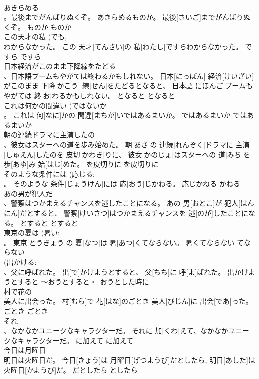 \documentclass[8pt]{extreport}
\begin{document}
\begin{CJK}{UTF8}{min}
\\	あきらめる 
\\	。最後までがんばりぬくぞ。	あきらめるものか。 最後[さいご]までがんばりぬくぞ。	ものか	ものか	
\\	この天才の私 (でも, 
\\	わからなかった。	この 天才[てんさい]の 私[わたし]ですらわからなかった。	ですら	ですら	
\\	日本経済がこのまま下降線をたどる 
\\	、日本語ブームもやがては終わるかもしれない。	日本[にっぽん] 経済[けいざい]がこのまま 下降[かこう] 線[せん]をたどるとなると、 日本語[にほんご]ブームもやがては 終[お]わるかもしれない。	となると	となると	
\\	これは何かの間違い (ではないか 
\\	。	これは 何[なに]かの 間違[まちが]いではあるまいか。	ではあるまいか	ではあるまいか	
\\	朝の連続ドラマに主演したの 
\\	、彼女はスターへの道を歩み始めた。	朝[あさ]の 連続[れんぞく]ドラマに 主演[しゅえん]したのを 皮切[かわき]りに、 彼女[かのじょ]はスターへの 道[みち]を 歩[あゆ]み 始[はじ]めた。	を皮切りに	を皮切りに	
\\	そのような条件には (応じる: 
\\	。	そのような 条件[じょうけん]には 応[おう]じかねる。	応じかねる	かねる	
\\	あの男が犯人だ 
\\	、警察はつかまえるチャンスを逃したことになる。	あの 男[おとこ]が 犯人[はんにん]だとすると、 警察[けいさつ]はつかまえるチャンスを 逃[のが]したことになる。	とすると	とすると	
\\	東京の夏は (暑い: 
\\	。	東京[とうきょう]の 夏[なつ]は 暑[あつ]くてならない。	暑くてならない	てならない	
\\	(出かける: 
\\	、父に呼ばれた。	出[で]かけようとすると、 父[ちち]に 呼[よ]ばれた。	出かけようとすると	～おうとすると・~おうとした時に	
\\	村で花の 
\\	美人に出会った。	村[むら]で 花[はな]のごとき 美人[びじん]に 出会[であ]った。	ごとき	ごとき	
\\	それ 
\\	、なかなかユニークなキャラクターだ。	それに 加[くわ]えて、なかなかユニークなキャラクターだ。	に加えて	に加えて	
\\	今日は月曜日 
\\	明日は火曜日だ。	今日[きょう]は 月曜日[げつようび]だとしたら, 明日[あした]は 火曜日[かようび]だ。	だとしたら	としたら	

\end{CJK}
\end{document}
